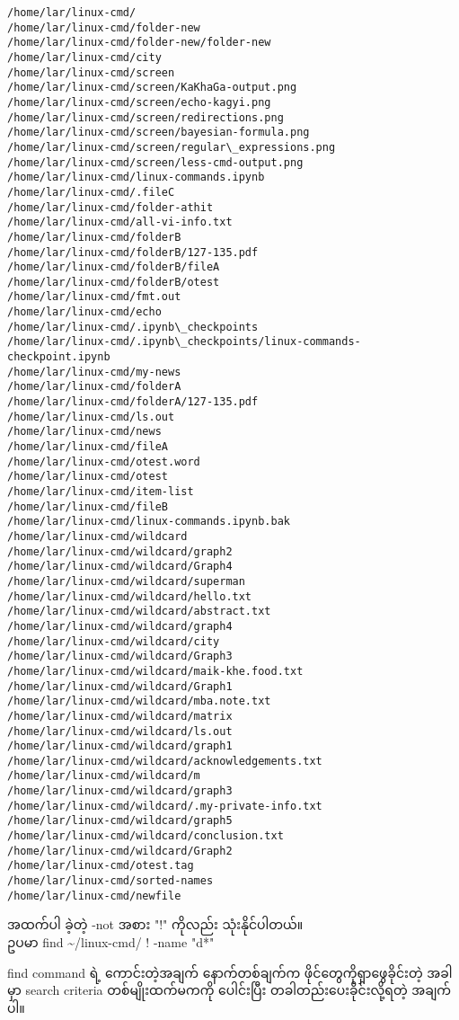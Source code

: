 \documentclass[11pt]{article}
\begin{document}
    \begin{Verbatim}[commandchars=\\\{\}]
/home/lar/linux-cmd/
/home/lar/linux-cmd/folder-new
/home/lar/linux-cmd/folder-new/folder-new
/home/lar/linux-cmd/city
/home/lar/linux-cmd/screen
/home/lar/linux-cmd/screen/KaKhaGa-output.png
/home/lar/linux-cmd/screen/echo-kagyi.png
/home/lar/linux-cmd/screen/redirections.png
/home/lar/linux-cmd/screen/bayesian-formula.png
/home/lar/linux-cmd/screen/regular\_expressions.png
/home/lar/linux-cmd/screen/less-cmd-output.png
/home/lar/linux-cmd/linux-commands.ipynb
/home/lar/linux-cmd/.fileC
/home/lar/linux-cmd/folder-athit
/home/lar/linux-cmd/all-vi-info.txt
/home/lar/linux-cmd/folderB
/home/lar/linux-cmd/folderB/127-135.pdf
/home/lar/linux-cmd/folderB/fileA
/home/lar/linux-cmd/folderB/otest
/home/lar/linux-cmd/fmt.out
/home/lar/linux-cmd/echo
/home/lar/linux-cmd/.ipynb\_checkpoints
/home/lar/linux-cmd/.ipynb\_checkpoints/linux-commands-checkpoint.ipynb
/home/lar/linux-cmd/my-news
/home/lar/linux-cmd/folderA
/home/lar/linux-cmd/folderA/127-135.pdf
/home/lar/linux-cmd/ls.out
/home/lar/linux-cmd/news
/home/lar/linux-cmd/fileA
/home/lar/linux-cmd/otest.word
/home/lar/linux-cmd/otest
/home/lar/linux-cmd/item-list
/home/lar/linux-cmd/fileB
/home/lar/linux-cmd/linux-commands.ipynb.bak
/home/lar/linux-cmd/wildcard
/home/lar/linux-cmd/wildcard/graph2
/home/lar/linux-cmd/wildcard/Graph4
/home/lar/linux-cmd/wildcard/superman
/home/lar/linux-cmd/wildcard/hello.txt
/home/lar/linux-cmd/wildcard/abstract.txt
/home/lar/linux-cmd/wildcard/graph4
/home/lar/linux-cmd/wildcard/city
/home/lar/linux-cmd/wildcard/Graph3
/home/lar/linux-cmd/wildcard/maik-khe.food.txt
/home/lar/linux-cmd/wildcard/Graph1
/home/lar/linux-cmd/wildcard/mba.note.txt
/home/lar/linux-cmd/wildcard/matrix
/home/lar/linux-cmd/wildcard/ls.out
/home/lar/linux-cmd/wildcard/graph1
/home/lar/linux-cmd/wildcard/acknowledgements.txt
/home/lar/linux-cmd/wildcard/m
/home/lar/linux-cmd/wildcard/graph3
/home/lar/linux-cmd/wildcard/.my-private-info.txt
/home/lar/linux-cmd/wildcard/graph5
/home/lar/linux-cmd/wildcard/conclusion.txt
/home/lar/linux-cmd/wildcard/Graph2
/home/lar/linux-cmd/otest.tag
/home/lar/linux-cmd/sorted-names
/home/lar/linux-cmd/newfile

    \end{Verbatim}

    အထက်ပါ ခဲ့တဲ့ -not အစား "!" ကိုလည်း သုံးနိုင်ပါတယ်။\\
ဥပမာ find \textasciitilde{}/linux-cmd/ ! -name "d*"

find command ရဲ့ ကောင်းတဲ့အချက် နောက်တစ်ချက်က ဖိုင်တွေကိုရှာဖွေခိုင်းတဲ့
အခါမှာ search criteria တစ်မျိုးထက်မကကို ပေါင်းပြီး
တခါတည်းပေးခိုင်းလို့ရတဲ့ အချက်ပါ။
\end{document}
